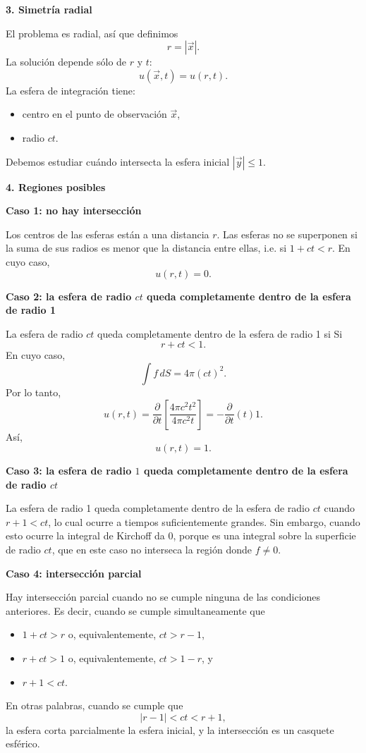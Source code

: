 \documentclass[11pt,spanish]{article}
\newcounter{problema}
\begin{document}
{\bf 3. Simetría radial}

El problema es radial, así que definimos
$$
r=|\vec x|.
$$
La solución depende sólo de $r$ y $t$:
$$
u(\vec x,t)=u(r,t).
$$
La esfera de integración tiene:
\begin{itemize}
\item centro en el punto de observación $\vec x$,
\item radio $ct$.
\end{itemize}
Debemos estudiar cuándo intersecta la esfera inicial $ |\vec y|\le1$.

{\bf 4. Regiones posibles}

{\bf Caso 1: no hay intersección}

Los centros de las esferas están a una distancia $r$.
Las esferas no se superponen si la suma de sus radios es menor que la distancia entre ellas, i.e. si $1+ct<r$.
En cuyo caso,
$$
u(r,t)=0.
$$

{\bf Caso 2: la esfera de radio $ct$ queda completamente dentro de la esfera de radio 1}

La esfera de radio $ct$ queda completamente dentro de la esfera de radio 1 si
Si
$$
r+ct<1.
$$
En cuyo caso,
$$
\int f\,dS =4\pi(ct)^2.
$$
Por lo tanto,
$$
u(r,t)
=
\frac{\partial}{\partial t}
\left[
\frac{4\pi c^2 t^2}{4\pi c^2 t}
\right]
=
- \frac{\partial}{\partial t}(t)
1.
$$
Así,
$$
u(r,t)=1.
$$

{\bf Caso 3: la esfera de radio $1$ queda completamente dentro de la esfera de radio $ct$}

La esfera de radio 1 queda completamente dentro de la esfera de radio $ct$ cuando $r+1<ct$, lo cual ocurre a tiempos suficientemente grandes.
Sin embargo, cuando esto ocurre la integral de Kirchoff da 0, porque es una integral sobre la superficie de radio $ct$, que en este caso no interseca la regi\'on donde $f\neq 0$.

{\bf Caso 4: intersección parcial}

Hay intersecci\'on parcial cuando no se cumple ninguna de las condiciones anteriores.
Es decir, cuando se cumple simultaneamente que
\begin{itemize}
\item $1+ct>r$ o, equivalentemente, $ct>r-1$,
\item $r+ct>1$ o, equivalentemente, $ct>1-r$, y
\item $r+1<ct$.
\end{itemize}
En otras palabras, cuando se cumple que
$$
|r-1|<ct<r+1,
$$
la esfera corta parcialmente la esfera inicial, y la intersección es un casquete esférico.
\end{document}
